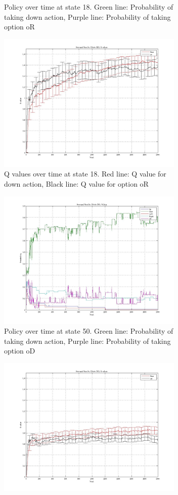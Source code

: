 \documentclass{acm_proc_article-sp}
\begin{document}
\begin{figure}[!htbp]
\begin{subfigure}[h]{.45\textwidth}
    \caption{Policy over time at state 18. Green line: Probability of taking down action, Purple line: Probability of taking option oR}
  \end{subfigure}
  \hfill
  \begin{subfigure}[h]{.45\textwidth}
  \centering
    \includegraphics[width=3.5in]{Q18.jpeg}
    \caption{Q values over time at state 18. Red line: Q value for down action, Black line: Q value for option oR}
  \end{subfigure}
    \hfill
  \begin{subfigure}[h]{.45\textwidth}
  \centering
    \includegraphics[width=3.5in]{pol50.jpeg}
    \caption{Policy over time at state 50. Green line: Probability of taking down action, Purple line: Probability of taking option oD}
  \end{subfigure}
    \hfill
  \begin{subfigure}[h]{.45\textwidth}
  \centering
    \includegraphics[width=3.5in]{Q50.jpeg}

\end{subfigure}
\end{figure}
\end{document}
